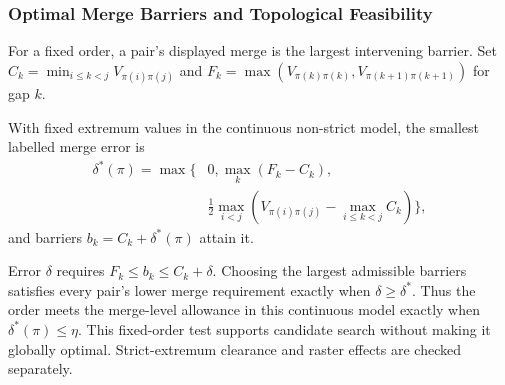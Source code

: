 \subsubsection{Optimal Merge Barriers and Topological Feasibility}
For a fixed order, a pair's displayed merge is the largest intervening barrier. Set $C_k=\min_{i\le k<j}V_{\pi(i)\pi(j)}$ and $F_k=\max(V_{\pi(k)\pi(k)},V_{\pi(k+1)\pi(k+1)})$ for gap $k$.
\begin{proposition}\label{prop:barriers}
With fixed extremum values in the continuous non-strict model, the smallest labelled merge error is
\begin{equation}\label{eq:delta}
\begin{split}
 \delta^*(\pi)=\max\bigg\{&0,\max_k(F_k-C_k),\\
 &\frac12\max_{i<j}\left(V_{\pi(i)\pi(j)}-
                         \max_{i\le k<j}C_k\right)\bigg\},
\end{split}
\end{equation}
and barriers $b_k=C_k+\delta^*(\pi)$ attain it.
\end{proposition}
Error $\delta$ requires $F_k\le b_k\le C_k+\delta$. Choosing the largest admissible barriers satisfies every pair's lower merge requirement exactly when $\delta\ge\delta^*$. Thus the order meets the merge-level allowance in this continuous model exactly when $\delta^*(\pi)\le\eta$. This fixed-order test supports candidate search without making it globally optimal. Strict-extremum clearance and raster effects are checked separately.

